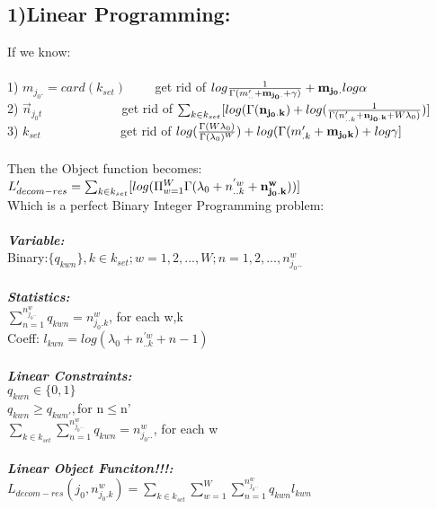 \documentclass{article}
\begin{document}
\begin{spacing}{1.1}
\section{1)Linear Programming:}
If we know:\\ \\
1) $m_{j_{0}.}=card(k_{set})\ \ \ \ \ \ \ \ \ $   get rid of $ log \frac{1}{\Gamma(m_{..}'+{\bf m_{j_{0}.}}+\gamma)}+{\bf m_{j_{0}.}}log \alpha$\\ 
2) $\vec n_{j_{0}t}\ \ \ \ \ \ \ \ \ \ \ \ \ \ \ \ \ \ \ \ \ \ \ \ \ \ \ $            get rid of $\sum_{k\in k_{set}}[log(\Gamma({\bf n_{j_{0}.k}})+log(\frac{1}{\Gamma(n_{..k}'+{\bf{n_{j_{0}.k}}}+W\lambda_{0})})]$\\
3) $k_{set}\ \ \ \ \ \ \ \ \ \ \ \ \ \ \ \ \ \ \ \ \ \ \ \ \ \ \  $                    get rid of $log(\frac{\Gamma(W\lambda_{0})}{\Gamma(\lambda_{0})^{W}})+log(\Gamma(m_{.k}'+{\bf m_{j_{0}k}})+log \gamma]$\\ \\
Then the Object function becomes:\\
$L'_{decom-res}= \sum_{k\in k_{set}}[log(\Pi_{w=1}^{W}\Gamma(\lambda_{0}+n_{..k}^{'w}+{\bf n_{j_{0}.k}^{w}}))]$\\ 
Which is a perfect Binary Integer Programming problem:\\ \\
{\bf \emph{Variable:}}\\
Binary:$\{q_{kwn}\},k\in k_{set};w=1,2,...,W;n=1,2,...,n_{j_{0}..}^{w}$\\ \\
{\bf \emph{Statistics:}}\\
$\sum_{n=1}^{n_{j_{0}..}^{w}}q_{kwn}= n_{j_{0}.k}^{w}$, for each w,k\\
Coeff: $l_{kwn}=log(\lambda_{0}+n^{'w}_{..k}+n-1)$\\ \\
{\bf \emph{Linear Constraints:}}\\
$q_{kwn}\in\{0,1\}$\\
$q_{kwn}\geq q_{kwn'},$for n$\leq$n'\\
$\sum_{k\in k_{set}}\sum_{n=1}^{n_{j_{0}..}^{w}}q_{kwn}=n_{j_{0}..}^{w}$, for each w\\\\
{\bf \emph{Linear Object Funciton!!!:}}\\
$L_{decom-res}(j_{0},n_{j_{0}.k}^{w})=\sum_{k\in k_{set}}\sum_{w=1}^{W}\sum_{n=1}^{n_{j_{0}..}^{w}}q_{kwn}l_{kwn}$


\end{spacing}
\end{document}
